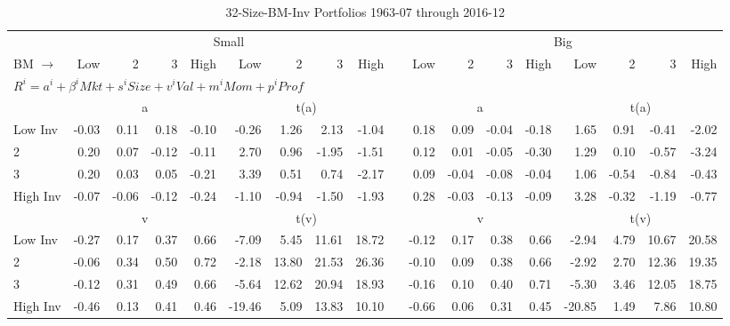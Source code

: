
\begin{table}[!ht]
\small
\centering
\caption{32-Size-BM-Inv Portfolios 1963-07 through 2016-12}
\begin{tabular}{lrrrrrrrrlrrrrrrrr}
  \toprule
    & \multicolumn{8}{c}{Small} & & \multicolumn{8}{c}{Big} \\
      \cmidrule(r){2-9} \cmidrule(r){11-18}
    BM $\rightarrow$ & Low & 2 & 3 & High & Low & 2 & 3 & High & & Low & 2 & 3 & High & Low & 2 & 3 & High \\ 
  \midrule
  \multicolumn{17}{l}{$R^i=a^i+\beta^iMkt+s^iSize+v^iVal+m^iMom+p^iProf$} \\

  
    
      & \multicolumn{4}{c}{a} & \multicolumn{4}{c}{t(a)}
      &
      & \multicolumn{4}{c}{a} & \multicolumn{4}{c}{t(a)}
    
    \\
      \cmidrule(r){2-5} \cmidrule(r){6-9} \cmidrule(r){11-14} \cmidrule(r){15-18}

    Low Inv   & -0.03  & 0.11  & 0.18  & -0.10  & -0.26  & 1.26  & 2.13  & -1.04 & & 0.18  & 0.09  & -0.04  & -0.18  & 1.65  & 0.91  & -0.41  & -2.02  \\
           2  & 0.20  & 0.07  & -0.12  & -0.11  & 2.70  & 0.96  & -1.95  & -1.51 & & 0.12  & 0.01  & -0.05  & -0.30  & 1.29  & 0.10  & -0.57  & -3.24  \\
           3  & 0.20  & 0.03  & 0.05  & -0.21  & 3.39  & 0.51  & 0.74  & -2.17 & & 0.09  & -0.04  & -0.08  & -0.04  & 1.06  & -0.54  & -0.84  & -0.43  \\
    High Inv  & -0.07  & -0.06  & -0.12  & -0.24  & -1.10  & -0.94  & -1.50  & -1.93 & & 0.28  & -0.03  & -0.13  & -0.09  & 3.28  & -0.32  & -1.19  & -0.77  \\

  
    
      & \multicolumn{4}{c}{v} & \multicolumn{4}{c}{t(v)}
      &
      & \multicolumn{4}{c}{v} & \multicolumn{4}{c}{t(v)}
    
    \\
      \cmidrule(r){2-5} \cmidrule(r){6-9} \cmidrule(r){11-14} \cmidrule(r){15-18}

    Low Inv   & -0.27  & 0.17  & 0.37  & 0.66  & -7.09  & 5.45  & 11.61  & 18.72 & & -0.12  & 0.17  & 0.38  & 0.66  & -2.94  & 4.79  & 10.67  & 20.58  \\
           2  & -0.06  & 0.34  & 0.50  & 0.72  & -2.18  & 13.80  & 21.53  & 26.36 & & -0.10  & 0.09  & 0.38  & 0.66  & -2.92  & 2.70  & 12.36  & 19.35  \\
           3  & -0.12  & 0.31  & 0.49  & 0.66  & -5.64  & 12.62  & 20.94  & 18.93 & & -0.16  & 0.10  & 0.40  & 0.71  & -5.30  & 3.46  & 12.05  & 18.75  \\
    High Inv  & -0.46  & 0.13  & 0.41  & 0.46  & -19.46  & 5.09  & 13.83  & 10.10 & & -0.66  & 0.06  & 0.31  & 0.45  & -20.85  & 1.49  & 7.86  & 10.80  \\


\end{tabular}
\end{table}
